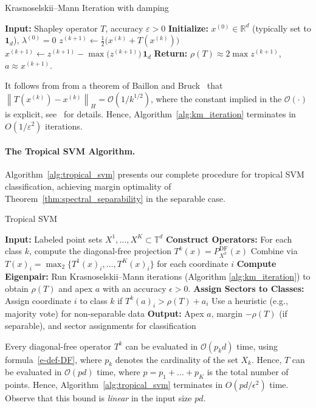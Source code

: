\documentclass{article}
\renewcommand{\leq}{\leqslant}
\newcommand{\R}{\mathbb{R}}
\newcommand{\trop}{\mathbb{T}}
\begin{document}
\begin{algorithm}
\caption{Krasnoselskii--Mann Iteration with damping~\cite{akianmfcs}}\label{alg:km_iteration}
\begin{algorithmic}[1]
\STATE \textbf{Input:} Shapley operator $T$, accuracy $\varepsilon > 0$
\STATE \textbf{Initialize:} $x^{(0)} \in \R^d$ (typically set to $\mathbf{1}_d$), $\lambda^{(0)} = 0$
\REPEAT
  \STATE $z^{(k+1)} \leftarrow \frac{1}{2}\bigl(x^{(k)} + T(x^{(k)})\bigr)$
  \STATE $x^{(k+1)} \leftarrow z^{(k+1)} - \max\bigl(z^{(k+1)}\bigr)\,\mathbf{1}_d$ 
  \UNTIL{$\left\|T(x^{(k)})-x^{(k)}\right\|_H\leq \varepsilon$}
  \STATE \textbf{Return:} $\rho(T) \approx 2\max z^{(k+1)}$,
  $a \approx x^{(k+1)}$.
\end{algorithmic}
\end{algorithm}
It follows from from a theorem of Baillon and Bruck~\cite{baillonbruck} that $\left\|T(x^{(k)})-x^{(k)}\right\|_H
= \mathcal{O}(1/k^{1/2})$, where the constant implied in the $\mathcal{O}(\cdot)$ is explicit, 
see~\cite{akianmfcs} for details. 
Hence, Algorithm~\ref{alg:km_iteration} terminates in $O(1/\varepsilon^2)$ iterations.

\paragraph{The Tropical SVM Algorithm.}\label{subsec:complete_algorithm}
Algorithm~\ref{alg:tropical_svm} presents our complete procedure for tropical SVM classification, achieving margin optimality of Theorem~\ref{thm:spectral_separability} in the separable case.

\begin{algorithm}
\caption{Tropical SVM}\label{alg:tropical_svm}
\begin{algorithmic}[1]
\STATE \textbf{Input:} Labeled point sets $X^1,\dots,X^K \subset \trop^d$
\STATE \textbf{Construct Operators:}
  \STATE \quad For each class $k$, compute the diagonal-free projection $T^k(x) = P^{\textrm{DF}}_{X^k}(x)$
  \STATE \quad Combine via $T(x)_i = \operatorname{\max}_2\{T^1(x)_i, \dots, T^K(x)_i\}$ for each coordinate $i$
\STATE \textbf{Compute Eigenpair:}
  \STATE \quad Run Krasnoselskii--Mann iterations (Algorithm \ref{alg:km_iteration}) to obtain $\rho(T)$ and apex $a$ with an accuracy $\epsilon>0$.
\STATE \textbf{Assign Sectors to Classes:}
    \STATE Assign coordinate $i$ to class $k$ if $T^k(a)_i > \rho(T) + a_i$
  \ELSE
    \STATE Use a heuristic (e.g., majority vote) for non-separable data
  \ENDIF
\STATE \textbf{Output:} Apex $a$, margin $-\rho(T)$ (if separable), and sector assignments for classification
\end{algorithmic}
\end{algorithm}
Every diagonal-free operator $T^k$ can be evaluated in $\mathcal{O}(p_k d)$ time, using formula~\eqref{e-def-DF},
where $p_k$ denotes the cardinality of the set $X_k$. Hence, $T$ can be evaluated in
$\mathcal{O}(pd)$ time, where $p=p_1+\dots+p_K$ is the total number of points.
Hence, Algorithm~\ref{alg:tropical_svm} terminates in $O(pd/\epsilon^2)$ time. Observe
that this bound is {\em linear} in the input size $pd$.
\end{document}
